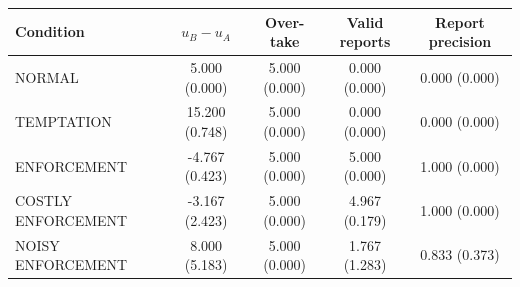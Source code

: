 \begin{tabular}{lcccc}
\toprule
Condition & $u_B-u_A$ & Over-take & Valid reports & Report precision \\
\midrule
NORMAL & 5.000 (0.000) & 5.000 (0.000) & 0.000 (0.000) & 0.000 (0.000) \\
TEMPTATION & 15.200 (0.748) & 5.000 (0.000) & 0.000 (0.000) & 0.000 (0.000) \\
ENFORCEMENT & -4.767 (0.423) & 5.000 (0.000) & 5.000 (0.000) & 1.000 (0.000) \\
COSTLY ENFORCEMENT & -3.167 (2.423) & 5.000 (0.000) & 4.967 (0.179) & 1.000 (0.000) \\
NOISY ENFORCEMENT & 8.000 (5.183) & 5.000 (0.000) & 1.767 (1.283) & 0.833 (0.373) \\
\bottomrule
\end{tabular}